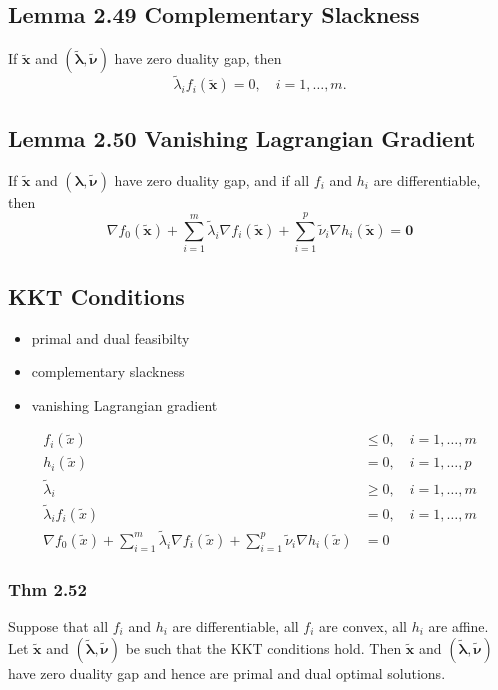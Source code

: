 \subsection*{Lemma 2.49 Complementary Slackness}
If $\tilde{\mathbf{x}}$ and $(\tilde{\boldsymbol{\lambda}}, \tilde{\boldsymbol{\nu}})$ have zero duality gap, then
$$
\tilde{\lambda}_{i} f_{i}(\tilde{\mathbf{x}})=0, \quad i=1, \ldots, m .
$$

\subsection*{Lemma 2.50 Vanishing Lagrangian Gradient}
If $\tilde{\mathbf{x}}$ and $(\boldsymbol{\lambda}, \tilde{\boldsymbol{\nu}})$ have zero duality gap, and if all $f_{i}$ and $h_{i}$ are differentiable, then
$$
\nabla f_{0}(\tilde{\mathbf{x}})+\sum_{i=1}^{m} \tilde{\lambda}_{i} \nabla f_{i}(\tilde{\mathbf{x}})+\sum_{i=1}^{p} \tilde{\nu}_{i} \nabla h_{i}(\tilde{\mathbf{x}})=\mathbf{0}
$$

\subsection*{KKT Conditions}
\begin{itemize}[leftmargin=*]
    \item primal and dual feasibilty
    \item complementary slackness
    \item vanishing Lagrangian gradient
\end{itemize}

$$
\begin{aligned}
f_{i}(\tilde{x}) & \leq 0, \quad i=1, \ldots, m \\
h_{i}(\tilde{x}) &=0, \quad i=1, \ldots, p \\
\tilde{\lambda}_{i} & \geq 0, \quad i=1, \ldots, m \\
\tilde{\lambda}_{i} f_{i}(\tilde{x}) &=0, \quad i=1, \ldots, m \\
\nabla f_{0}(\tilde{x})+\sum_{i=1}^{m} \tilde{\lambda}_{i} \nabla f_{i}(\tilde{x})+\sum_{i=1}^{p} \tilde{\nu}_{i} \nabla h_{i}(\tilde{x})&=0
\end{aligned}
$$




\subsubsection*{Thm 2.52}
Suppose that all $f_{i}$ and $h_{i}$ are differentiable, all $f_{i}$ are convex, all $h_{i}$ are affine.
Let $\tilde{\mathbf{x}}$ and $(\tilde{\boldsymbol{\lambda}}, \tilde{\boldsymbol{\nu}})$ be such that the KKT conditions hold.
Then $\tilde{\mathbf{x}}$ and $(\tilde{\boldsymbol{\lambda}}, \tilde{\boldsymbol{\nu}})$ have zero duality gap and hence are primal and dual optimal solutions.





